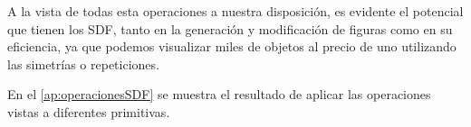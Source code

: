 A la vista de todas esta operaciones a nuestra disposición, es evidente el potencial que tienen los SDF, tanto en la generación y modificación de figuras como en su eficiencia, ya que podemos visualizar miles de objetos al precio de uno utilizando las simetrías o repeticiones.\newline

En el \autoref{ap:operacionesSDF} se muestra el resultado de aplicar las operaciones vistas a diferentes primitivas.